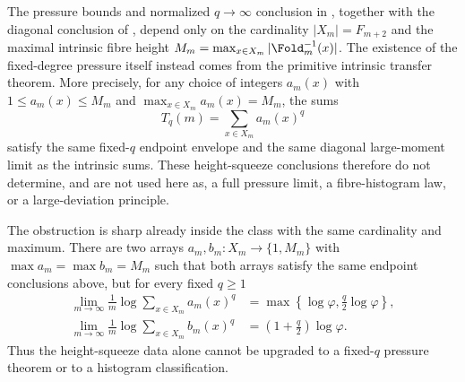 \begin{theorem}
\label{prop:height-squeeze-only-endpoint-firewall}
\label{thm:height-squeeze-pressure-nondetermination}
The pressure bounds and normalized \(q\to\infty\) conclusion in
, together with the diagonal conclusion
of , depend only on the
cardinality \(|X_m|=F_{m+2}\) and the maximal intrinsic fibre height
\(M_m=\max_{x\in X_m}|\Fold_m^{-1}(x)|\).  The existence of the fixed-degree
pressure itself instead comes from the primitive intrinsic transfer theorem.
More precisely, for any choice
of integers \(a_m(x)\) with \(1\le a_m(x)\le M_m\) and
\(\max_{x\in X_m}a_m(x)=M_m\), the sums
\[
  T_q(m)=\sum_{x\in X_m}a_m(x)^q
\]
satisfy the same fixed-\(q\) endpoint envelope and the same diagonal
large-moment limit as the intrinsic sums.  These height-squeeze conclusions
therefore do not determine, and are not used here as, a full pressure limit, a
fibre-histogram law, or a large-deviation principle.

The obstruction is sharp already inside the class with the same cardinality and
maximum.  There are two arrays \(a_m,b_m\colon X_m\to\{1,
M_m\}\) with \(\max a_m=\max b_m=M_m\) such that both arrays satisfy the same
endpoint conclusions above, but for every fixed \(q\ge1\)
\begin{align*}
  \lim_{m\to\infty}{\frac1m}\log\sum_{x\in X_m} a_m(x)^q
  &=\max\!\left\{\log\varphi,{\frac q2}\log\varphi\right\},\\
  \lim_{m\to\infty}{\frac1m}\log\sum_{x\in X_m} b_m(x)^q
  &=\left(1+{\frac q2}\right)\log\varphi .
\end{align*}
Thus the height-squeeze data alone cannot be upgraded to a fixed-\(q\) pressure
theorem or to a histogram classification.
\end{theorem}

